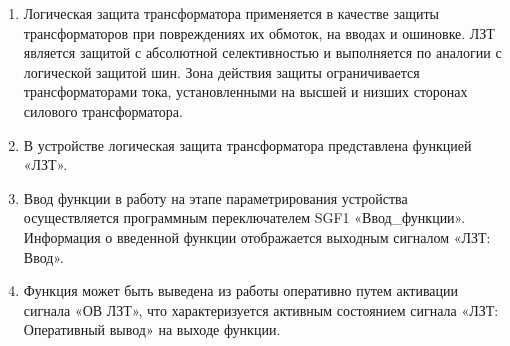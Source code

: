
\color{black}

\begin{enumerate}

\item
Логическая защита трансформатора применяется в качестве защиты трансформаторов при повреждениях их обмоток, на вводах и ошиновке. ЛЗТ является защитой с абсолютной селективностью и выполняется по аналогии с логической защитой шин. Зона действия защиты ограничивается трансформаторами тока, установленными на высшей и низших сторонах силового трансформатора.

\item
В устройстве логическая защита трансформатора представлена функцией «ЛЗТ». 

\item
Ввод функции в работу на этапе параметрирования устройства осуществляется программным переключателем SGF1 «Ввод\_функции». Информация о введенной функции отображается выходным сигналом «ЛЗТ: Ввод».

\item
Функция может быть выведена из работы оперативно путем активации сигнала «ОВ ЛЗТ», что характеризуется активным состоянием сигнала «ЛЗТ: Оперативный вывод» на выходе функции.


\end{enumerate}
